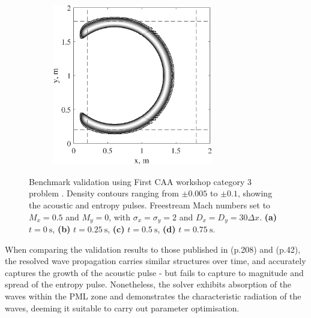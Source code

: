 \begin{figure}[h!]
\begin{subfigure}[b]{0.475\textwidth}
            \caption{}  
            \label{fig:Benchmark05}
        \end{subfigure}
        \hfill
        \begin{subfigure}[b]{0.475\textwidth}   
            \centering 
            \includegraphics[width=7cm]{Figures/TechnicalAchievement/Res/Benchmark/Benchmark0.75s.eps}
            \caption{} 
            \label{fig:Benchmark075}
        \end{subfigure}
        \caption{Benchmark validation using First CAA workshop category 3 problem \cite{hardin1995caaworkshop}. Density contours ranging from $\pm0.005$ to $\pm0.1$, showing the acoustic and entropy pulses. Freestream Mach numbers set to $M_x=0.5$ and $M_y=0$, with $\sigma_x=\sigma_y=2$ and $D_x=D_y=30 \Delta x$. \textbf{(a)} $t=0 \ \mathrm{s}$, \textbf{(b)} $t=0.25 \ \mathrm{s}$, \textbf{(c)} $t=0.5 \ \mathrm{s}$, \textbf{(d)} $t=0.75 \ \mathrm{s}$.}
        \label{fig:Benchmark}
\end{figure}

When comparing the validation results to those published in \textcite{hu1996onabsorbingbc} (p.208) and \textcite{velu2010development} (p.42), the resolved wave propagation carries similar structures over time, and accurately captures the growth of the acoustic pulse - but fails to capture to magnitude and spread of the entropy pulse. Nonetheless, the solver exhibits absorption of the waves within the PML zone and demonstrates the characteristic radiation of the waves, deeming it suitable to carry out parameter optimisation.
